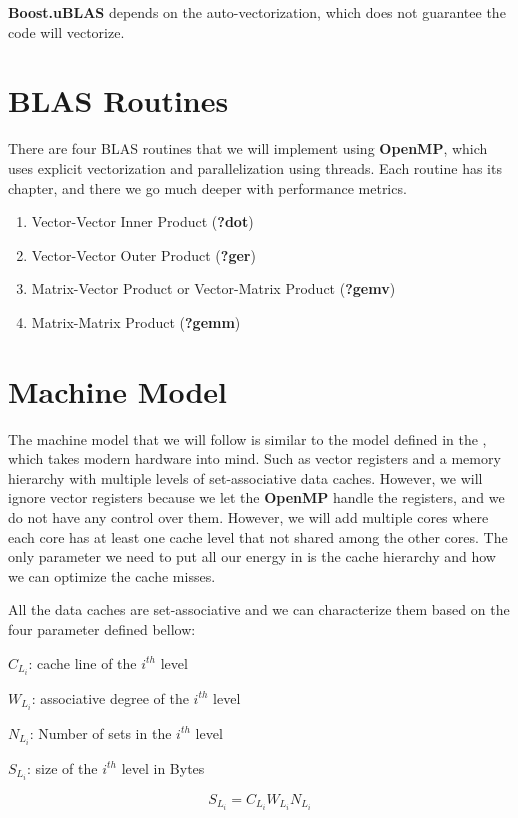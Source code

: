 \textbf{Boost.uBLAS} depends on the auto-vectorization, 
which does not guarantee the code will vectorize.

\section{BLAS Routines}

There are four BLAS routines that we will implement using \textbf{OpenMP}, 
which uses explicit vectorization and parallelization using threads. 
Each routine has its chapter, and there we go much deeper with performance metrics.

\begin{enumerate}
    \item Vector-Vector Inner Product (\textbf{?dot})
    \item Vector-Vector Outer Product (\textbf{?ger})
    \item Matrix-Vector Product or Vector-Matrix Product (\textbf{?gemv})
    \item Matrix-Matrix Product (\textbf{?gemm})
\end{enumerate}

\section{Machine Model}

The machine model that we will follow is similar to the model defined in the 
\citep{BLIS}, which takes modern hardware into mind. Such as vector registers 
and a memory hierarchy with multiple levels of set-associative data caches. 
However, we will ignore vector registers because we let the \textbf{OpenMP} handle 
the registers, and we do not have any control over them. However, 
we will add multiple cores where each core has at least one cache level 
that not shared among the other cores.
The only parameter we need to put all our energy in is the cache hierarchy and 
how we can optimize the cache misses.

All the data caches are set-associative and we can characterize them based 
on the four parameter defined bellow:

\(C_{L_i}\): cache line of the \(i^{th}\) level

\(W_{L_i}\): associative degree of the \(i^{th}\) level

\(N_{L_i}\): Number of sets in the \(i^{th}\) level

\(S_{L_i}\): size of the \(i^{th}\) level in Bytes

\begin{equation}
    S_{L_i} = C_{L_i}W_{L_i}N_{L_i}
    \label{eqcache_size}
\end{equation}

